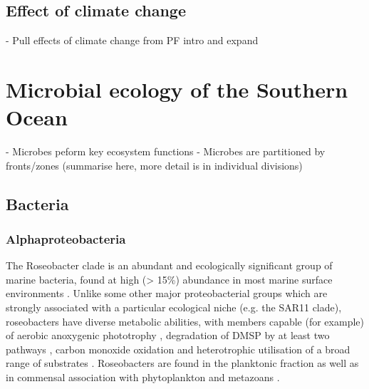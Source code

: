 \subsection{Effect of climate change}

  - Pull effects of climate change from PF intro and expand

\section{Microbial ecology of the Southern Ocean}

  - Microbes peform key ecosystem functions
  - Microbes are partitioned by fronts/zones (summarise here, more detail is in individual divisions)

\subsection{Bacteria}

\subsubsection{Alphaproteobacteria}


The Roseobacter clade is an abundant and ecologically significant group of marine bacteria, found at high (> 15\%) abundance in most marine surface environments \citep[][and references therein]{Buchan:2005hd}.
Unlike some other major proteobacterial groups which are strongly associated with a particular ecological niche (e.g. the SAR11 clade), roseobacters have diverse metabolic abilities, with members capable (for example) of aerobic anoxygenic phototrophy \cite{Biebl:2005fp,Beja:2002gt}, degradation of \ac{DMSP} by at least two pathways \cite{Miller:2004jz,Moran:2003cwa}, carbon monoxide oxidation \cite{King:2003kc} and heterotrophic utilisation of a broad range of substrates \citep[reviewed in][]{Brinkhoff:2008do}.
Roseobacters are found in the planktonic fraction as well as in commensal association with phytoplankton and metazoans \citep[reiviewed in][]{Buchan:2005hd}.

